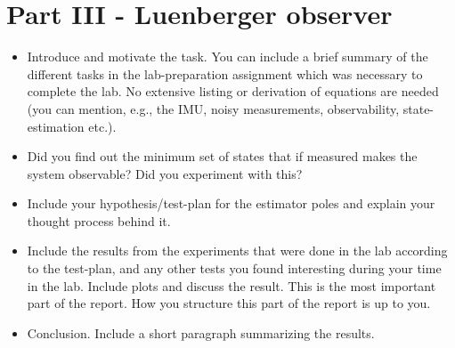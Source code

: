 \section{Part III - Luenberger observer}
\begin{itemize}
    \item Introduce and motivate the task. You can include a brief summary of the different tasks in the lab-preparation assignment which was necessary to complete the lab. No extensive listing or derivation of equations are needed (you can mention, e.g., the IMU, noisy measurements, observability, state-estimation etc.).
    \item Did you find out the minimum set of states that if measured makes the system observable? Did you experiment with this?
    \item Include your hypothesis/test-plan for the estimator poles and explain your thought process behind it.
    \item Include the results from the experiments that were done in the lab according to the test-plan, and any other tests you found interesting during your time in the lab. Include plots and discuss the result. This is the most important part of the report. How you structure this part of the report is up to you. 
    \item Conclusion. Include a short paragraph summarizing the results. 
\end{itemize}